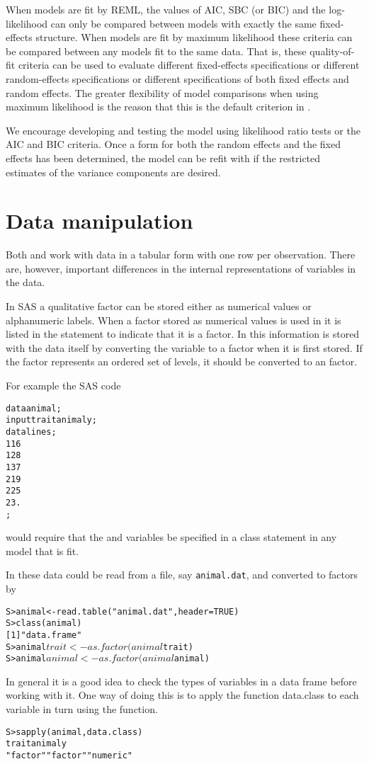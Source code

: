 \documentclass[]{article}
\newenvironment{Example}%
{\begin{list}{}{\setlength{\leftmargin}{.5\parindent}}%
  \item\begin{alltt}\small}%
    {\end{alltt}\end{list}}
\begin{document}
When models are fit by \textsf{REML}, the values of \textsf{AIC},
\textsf{SBC} (or \textsf{BIC}) and the log-likelihood can only be
compared between models with exactly the same fixed-effects structure.
When models are fit by maximum likelihood these criteria can be
compared between any models fit to the same data.  That is, these
quality-of-fit criteria can be used to evaluate different
fixed-effects specifications or different random-effects
specifications or different specifications of both fixed effects and
random effects.  The greater flexibility of model comparisons when
using maximum likelihood is the reason that this is the default
criterion in .

We encourage developing and testing the model using likelihood ratio
tests or the \textsf{AIC} and \textsf{BIC} criteria.  Once a form
for both the random effects and the fixed effects has been determined,
the model can be refit with  if the restricted
estimates of the variance components are desired.

\section{Data manipulation}
\label{sec:data}

Both  and  work with data in a tabular form
with one row per observation.  There are, however, important
differences in the internal representations of variables in the data.

In \textsf{SAS} a qualitative factor can be stored either as numerical
values or alphanumeric labels.  When a factor stored as numerical
values is used in  it is listed in the 
statement to indicate that it is a factor.  In \s{} this information
is stored with the data itself by converting the variable to a factor
when it is first stored.  If the factor represents an ordered set of
levels, it should be converted to an  factor.

For example the SAS code
\begin{Example}
data animal;
 input trait animal y;
 datalines;
1 1 6
1 2 8
1 3 7
2 1 9
2 2 5
2 3 .
;
\end{Example}
would require that the  and  variables be
specified in a class statement in any model that is fit.

In \s{} these data could be read from a file, say \texttt{animal.dat},
and converted to factors by
\begin{Example}
S> animal <- read.table( "animal.dat", header = TRUE )
S> class( animal )
[1] "data.frame"
S> animal$trait <- as.factor( animal$trait )
S> animal$animal <- as.factor( animal$animal )
\end{Example}
In general it is a good idea to check the types of variables in a data 
frame before working with it.  One way of doing this is to apply
the function \textsf{data.class} to each variable in turn using the
 function.
\begin{Example}
S> sapply( animal, data.class )
    trait    animal         y 
 "factor"  "factor" "numeric" 
\end{Example}
\end{document}
